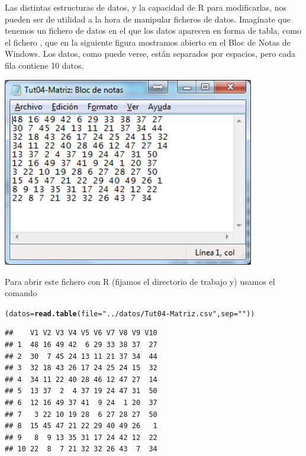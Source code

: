 \documentclass[10pt,a4paper]{article}\usepackage[]{graphicx}\usepackage[]{color}
\makeatletter
\newcommand{\hlstr}[1]{\textcolor[rgb]{0.192,0.494,0.8}{#1}}%
\newcommand{\hlstd}[1]{\textcolor[rgb]{0.345,0.345,0.345}{#1}}%
\newcommand{\hlkwb}[1]{\textcolor[rgb]{0.69,0.353,0.396}{#1}}%
\newcommand{\hlkwc}[1]{\textcolor[rgb]{0.333,0.667,0.333}{#1}}%
\newcommand{\hlkwd}[1]{\textcolor[rgb]{0.737,0.353,0.396}{\textbf{#1}}}%
\newenvironment{kframe}{%
 \def\at@end@of@kframe{}%
 \ifinner\ifhmode%
  \def\at@end@of@kframe{\end{minipage}}%
  \begin{minipage}{\columnwidth}%
 \fi\fi%
 \def\FrameCommand##1{\hskip\@totalleftmargin \hskip-\fboxsep
 \colorbox{shadecolor}{##1}\hskip-\fboxsep
     \hskip-\linewidth \hskip-\@totalleftmargin \hskip\columnwidth}%
 \MakeFramed {\advance\hsize-\width
   \@totalleftmargin\z@ \linewidth\hsize
   \@setminipage}}%
 {\par\unskip\endMakeFramed%
 \at@end@of@kframe}
\newenvironment{knitrout}{}{} %
\newcounter {cont01}
\makeatother
\begin{document}
Las distintas estructuras de datos, y la capacidad de R para modificarlas, nos pueden ser de utilidad a la hora de manipular ficheros de datos. Imagínate que tenemos un fichero de datos en el que los datos aparecen en forma de tabla, como el fichero , que en la siguiente figura mostramos abierto en el Bloc de Notas de Windows. Los datos, como puede verse, están separados por espacios, pero cada fila contiene 10 datos.
    \begin{center}
    \includegraphics[width=11cm]{../fig/Tut04-21.png}
    \end{center}
Para abrir este fichero con R (fijamos el directorio de trabajo y) usamos el comando
\begin{knitrout}
\color{fgcolor}\begin{kframe}
\begin{alltt}
\hlstd{(datos} \hlkwb{=} \hlkwd{read.table}\hlstd{(}\hlkwc{file}\hlstd{=}\hlstr{"../datos/Tut04-Matriz.csv"}\hlstd{,} \hlkwc{sep}\hlstd{=}\hlstr{" "}\hlstd{))}
\end{alltt}
\end{kframe}
\end{knitrout}
\vspace{-6.7mm}
\begin{knitrout}
\color{fgcolor}\begin{kframe}
\begin{verbatim}
##    V1 V2 V3 V4 V5 V6 V7 V8 V9 V10
## 1  48 16 49 42  6 29 33 38 37  27
## 2  30  7 45 24 13 11 21 37 34  44
## 3  32 18 43 26 17 24 25 24 15  32
## 4  34 11 22 40 28 46 12 47 27  14
## 5  13 37  2  4 37 19 24 47 31  50
## 6  12 16 49 37 41  9 24  1 20  37
## 7   3 22 10 19 28  6 27 28 27  50
## 8  15 45 47 21 22 29 40 49 26   1
## 9   8  9 13 35 31 17 24 42 12  22
## 10 22  8  7 21 32 32 26 43  7  34
\end{verbatim}
\end{kframe}
\end{knitrout}
\end{document}
